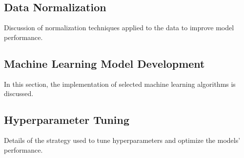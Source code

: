 \subsection{Data Normalization}
Discussion of normalization techniques applied to the data to improve model performance.

\subsection{Machine Learning Model Development}
In this section, the implementation of selected machine learning algorithms is discussed.

\subsection{Hyperparameter Tuning}
Details of the strategy used to tune hyperparameters and optimize the models' performance.
